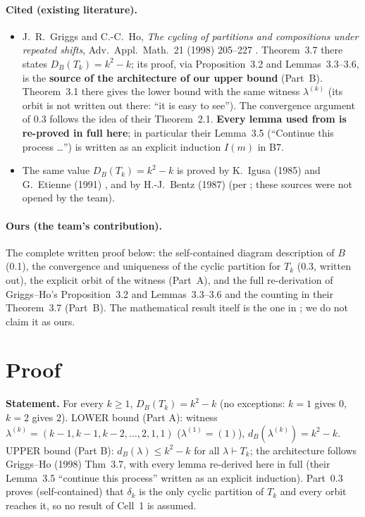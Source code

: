 \documentclass[11pt]{article}
\newcommand{\DB}{D_B}
\newcommand{\dB}{d_B}
\begin{document}
\paragraph{Cited (existing literature).}
\begin{itemize}
\item J.~R.~Griggs and C.-C.~Ho, \emph{The cycling of partitions and compositions under repeated shifts}, Adv.\ Appl.\ Math.\ 21 (1998) 205--227 \cite{GH}.
Theorem~3.7 there states $\DB(T_k)=k^2-k$; its proof, via Proposition~3.2 and Lemmas~3.3--3.6, is the \textbf{source of the architecture of our upper bound} (Part~B). Theorem~3.1 there gives the lower bound with the same witness $\lambda^{(k)}$ (its orbit is not written out there: ``it is easy to see''). The convergence argument of 0.3 follows the idea of their Theorem~2.1.
\textbf{Every lemma used from \cite{GH} is re-proved in full here}; in particular their Lemma~3.5 (``Continue this process \ldots'') is written as an explicit induction $I(m)$ in B7.
\item The same value $\DB(T_k)=k^2-k$ is proved by K.~Igusa (1985) \cite{Igusa} and G.~Etienne (1991) \cite{Etienne}, and by H.-J.~Bentz (1987) \cite{Bentz} (per \cite{GH}; these sources were not opened by the team).
\end{itemize}

\paragraph{Ours (the team's contribution).} The complete written proof below: the self-contained diagram description of $B$ (0.1), the convergence and uniqueness of the cyclic partition for $T_k$ (0.3, written out), the explicit orbit of the witness (Part~A), and the full re-derivation of Griggs--Ho's Proposition~3.2 and Lemmas~3.3--3.6 and the counting in their Theorem~3.7 (Part~B). The mathematical result itself is the one in \cite{GH,Igusa,Etienne}; we do not claim it as ours.

\section{Proof}\label{sec:proof}

\noindent\textbf{Statement.} For every $k\ge 1$, $\DB(T_k)=k^2-k$ (no exceptions: $k=1$ gives $0$, $k=2$ gives $2$).
LOWER bound (Part A): witness $\lambda^{(k)}=(k-1,k-1,k-2,\ldots,2,1,1)$ ($\lambda^{(1)}=(1)$), $\dB(\lambda^{(k)})=k^2-k$.
UPPER bound (Part B): $\dB(\lambda)\le k^2-k$ for all $\lambda\vdash T_k$; the architecture follows Griggs--Ho (1998) Thm~3.7, with every lemma re-derived here in full (their Lemma~3.5 ``continue this process'' written as an explicit induction).
Part~0.3 proves (self-contained) that $\delta_k$ is the only cyclic partition of $T_k$ and every orbit reaches it, so no result of Cell~1 is assumed.
\end{document}
